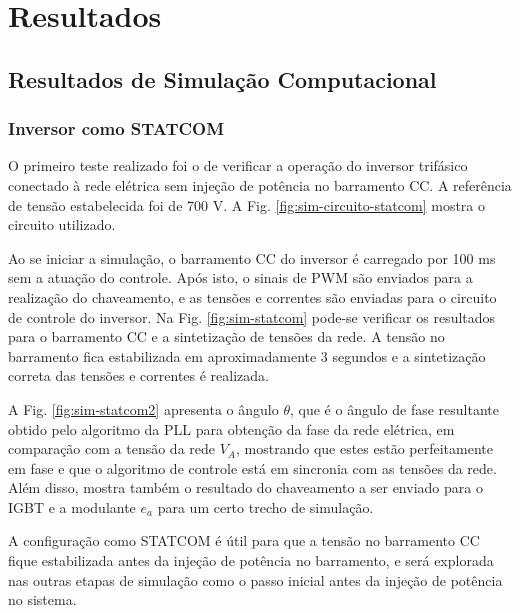 \chapter{Resultados}

\section{Resultados de Simulação Computacional}

\subsection{Inversor como STATCOM}

O primeiro teste realizado foi o de verificar a operação do inversor trifásico conectado 
à rede elétrica sem injeção de potência no barramento CC. A referência de tensão estabelecida foi de 700 V.
A Fig. \ref{fig:sim-circuito-statcom} mostra o circuito utilizado.

Ao se iniciar a simulação, o barramento CC do inversor é carregado por 100 ms sem a atuação do controle. 
Após isto, o sinais de PWM são enviados para a realização do chaveamento, e as tensões e correntes são enviadas para o circuito de controle do inversor.
Na Fig. \ref{fig:sim-statcom} pode-se verificar os resultados para o barramento CC e a sintetização de tensões da rede.
A tensão no barramento fica estabilizada em aproximadamente 3 segundos e a sintetização correta das tensões e correntes é realizada.

A Fig. \ref{fig:sim-statcom2} apresenta o ângulo $\theta$, que é o ângulo de fase resultante obtido pelo algoritmo da PLL para obtenção da fase da rede elétrica, 
em comparação com a tensão da rede $V_A$, mostrando que estes estão perfeitamente em fase e que o algoritmo de controle está em sincronia com as tensões da rede.
Além disso, mostra também o resultado do chaveamento a ser enviado para o IGBT e a modulante $e_a$ para um certo trecho de simulação.

A configuração como STATCOM é útil para que a tensão no barramento CC fique estabilizada antes da injeção de potência no barramento, 
e será explorada nas outras etapas de simulação como o passo inicial antes da injeção de potência no sistema.

